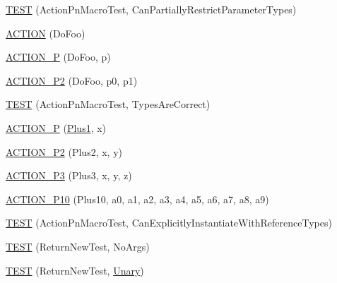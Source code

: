 \begin{DoxyCompactItemize}
\item 
\mbox{\hyperlink{namespacetesting_1_1gmock__generated__actions__test_a7222610b197216e7976b3fa751f97daf}{T\+E\+ST}} (Action\+Pn\+Macro\+Test, Can\+Partially\+Restrict\+Parameter\+Types)
\item 
\mbox{\hyperlink{namespacetesting_1_1gmock__generated__actions__test_a183b3863b3c2319ac414fe694455f58c}{A\+C\+T\+I\+ON}} (Do\+Foo)
\item 
\mbox{\hyperlink{namespacetesting_1_1gmock__generated__actions__test_a8487a3396f4f705e134e44584634ef1c}{A\+C\+T\+I\+O\+N\+\_\+P}} (Do\+Foo, p)
\item 
\mbox{\hyperlink{namespacetesting_1_1gmock__generated__actions__test_acd38e742235e154ad309f22e9a470a86}{A\+C\+T\+I\+O\+N\+\_\+\+P2}} (Do\+Foo, p0, p1)
\item 
\mbox{\hyperlink{namespacetesting_1_1gmock__generated__actions__test_ad702feced8b71b3708782b1a2274453e}{T\+E\+ST}} (Action\+Pn\+Macro\+Test, Types\+Are\+Correct)
\item 
\mbox{\hyperlink{namespacetesting_1_1gmock__generated__actions__test_a89c01b82e854ad79e3d139aa72477747}{A\+C\+T\+I\+O\+N\+\_\+P}} (\mbox{\hyperlink{namespacetesting_1_1gmock__generated__actions__test_a75e901c6d28c591c53a54320a294da55}{Plus1}}, x)
\item 
\mbox{\hyperlink{namespacetesting_1_1gmock__generated__actions__test_a0e2768c0fae30bc46ec6e322b29dd54c}{A\+C\+T\+I\+O\+N\+\_\+\+P2}} (Plus2, x, y)
\item 
\mbox{\hyperlink{namespacetesting_1_1gmock__generated__actions__test_afc911947c840aa9857eb2d06e4d80787}{A\+C\+T\+I\+O\+N\+\_\+\+P3}} (Plus3, x, y, z)
\item 
\mbox{\hyperlink{namespacetesting_1_1gmock__generated__actions__test_a4e48e01a7bfc369d279cc0c99a7d3c60}{A\+C\+T\+I\+O\+N\+\_\+\+P10}} (Plus10, a0, a1, a2, a3, a4, a5, a6, a7, a8, a9)
\item 
\mbox{\hyperlink{namespacetesting_1_1gmock__generated__actions__test_a20664d32f08c53d6f9fa5e020a85fab3}{T\+E\+ST}} (Action\+Pn\+Macro\+Test, Can\+Explicitly\+Instantiate\+With\+Reference\+Types)
\item 
\mbox{\hyperlink{namespacetesting_1_1gmock__generated__actions__test_a058a3d17071ddb888319ab71b491af94}{T\+E\+ST}} (Return\+New\+Test, No\+Args)
\item 
\mbox{\hyperlink{namespacetesting_1_1gmock__generated__actions__test_a64f3f8327d51c139b441846e809ae4bc}{T\+E\+ST}} (Return\+New\+Test, \mbox{\hyperlink{namespacetesting_1_1gmock__generated__actions__test_a61f0e6c3f2c07079299f1d6e1667ab92}{Unary}})

\end{DoxyCompactItemize}
